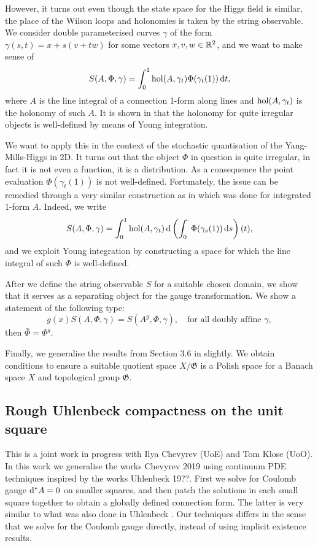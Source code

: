 \documentclass[./main.tex]{subfiles}
\begin{document}
However, it turns out even though the state space for the Higgs field is similar, the place of the Wilson loops and holonomies is taken by the string observable. We consider double parameterised curves $\gamma$ of the form $\gamma(s,t)=x+s(v+tw)$ for some vectors $x,v,w\in \mathbb R^2$, and we want to make sense of
$$S(A,\Phi,\gamma)=\int^1_0 \mathrm{hol}(A,\gamma_t)\Phi(\gamma_t(1))\,\mathrm{d} t,$$
where $A$ is the line integral of a connection 1-form along lines and $\mathrm{hol}(A,\gamma_t)$ is the holonomy of such $A$. It is shown in \cite{CCHS_2D_YM} that the holonomy for quite irregular objects is well-defined by means of Young integration. 

We want to apply this in the context of the stochastic quantisation of the Yang-Mills-Higgs in 2D. It turns out that the object $\Phi$ in question is quite irregular, in fact it is not even a function, it is a distribution. As a consequence the point evaluation $\Phi(\gamma_t(1))$ is not well-defined. Fortunately, the issue can be remedied through a very similar construction as in \cite{CCHS_2D_YM} which was done for integrated 1-form $A$.  Indeed, we write
$$S(A,\Phi,\gamma)=\int^1_0 \mathrm{hol}(A,\gamma_t)\,\mathrm{d}\left( \int^\cdot_0 \Phi(\gamma_s(1))\,\mathrm{d} s\right)(t),$$
and we exploit Young integration by constructing a space for which the line integral of such $\Phi$ is well-defined. 

After we define the string observable $S$ for a suitable chosen domain, we show that it serves as a separating object for the gauge transformation. We show a statement of the following type:
$$g(x)S(A,\Phi,\gamma)=S(A^g,\bar\Phi,\gamma), \  \ \ \text{ for all doubly affine }\gamma,$$
then $\bar\Phi=\Phi^g$. 

Finally, we generalise the results from Section 3.6 in \cite{CCHS_2D_YM} slightly. We obtain conditions to ensure a suitable quotient space $X/\mathfrak G$ is a Polish space for a Banach space $X$ and topological group $\mathfrak G$. 


\subsection{Rough Uhlenbeck compactness on the unit square}
This is a joint work in progress with Ilya Chevyrev (UoE) and Tom Klose (UoO). In this work we generalise the works Chevyrev 2019 using continuum PDE techniques inspired by the works Uhlenbeck 19??. First we solve for Coulomb gauge $\mathrm{d}^*A=0$ on smaller squares, and then patch the solutions in each small square together to obtain a globally defined connection form. The latter is very similar to what was also done in Uhlenbeck . Our techniques differs in the sense that we solve for the Coulomb gauge directly, instead of using implicit existence results. 
\end{document}
